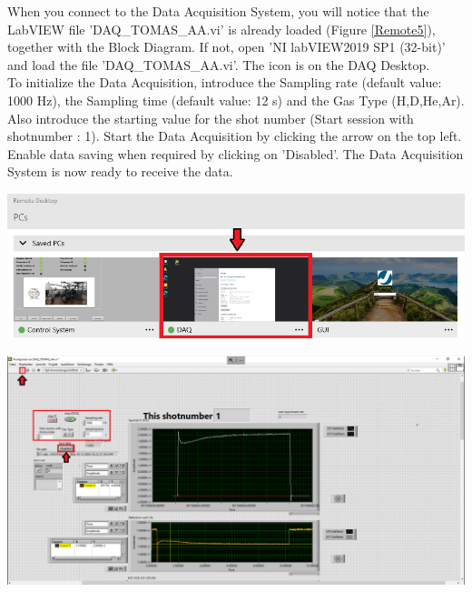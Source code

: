 \documentclass[fleqn,a4paper,20pt]{article}
\begin{document}
When you connect to the Data Acquisition System, you will notice that the LabVIEW file 'DAQ\_TOMAS\_AA.vi' is already loaded (Figure 	\ref{Remote5}), together with the Block Diagram. If not, open 'NI labVIEW2019 SP1 (32-bit)' and load the file 'DAQ\_TOMAS\_AA.vi'. The icon is on the DAQ Desktop.\\


To initialize the Data Acquisition, introduce the Sampling rate (default value: 1000 Hz), the Sampling time (default value: 12 s) and the Gas Type (H,D,He,Ar). Also introduce the starting value for the shot number (Start session with shotnumber : 1). Start the Data Acquisition by clicking the arrow on the top left. Enable data saving when required by clicking on 'Disabled'. The Data Acquisition System is now ready to receive the data.\\

\begin{minipage}{\textwidth}
	\centering
	\includegraphics[width=\linewidth]{Remote4}
	\label{Remote4}
	\vspace{0.2cm}
	
	\includegraphics[width=\linewidth]{Remote5}
	\label{Remote5}
\end{minipage}


\newpage
\end{document}
